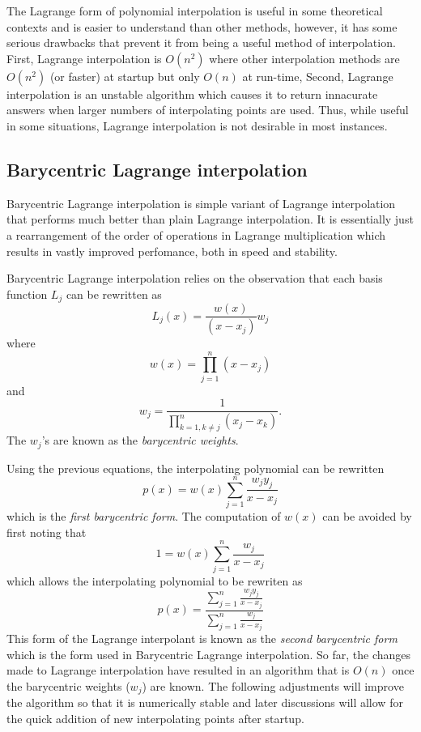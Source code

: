 The Lagrange form of polynomial interpolation is useful in some theoretical contexts and is easier to understand than other methods, however, it has some serious drawbacks that prevent it from being a
useful method of interpolation.
First, Lagrange interpolation is $O(n^2)$ where other interpolation methods are $O(n^2)$ (or faster) at startup but only $O(n)$ at run-time,
Second, Lagrange interpolation is an unstable algorithm which causes it to return innacurate answers when larger numbers of interpolating points are used.
Thus, while useful in some situations, Lagrange interpolation is not desirable in most instances.

\subsection*{Barycentric Lagrange interpolation}
Barycentric Lagrange interpolation is simple variant of Lagrange interpolation that performs much better than plain Lagrange interpolation.
It is essentially just a rearrangement of the order of operations in Lagrange multiplication which results in vastly improved perfomance, both in speed and stability.

Barycentric Lagrange interpolation relies on the observation that each basis function $L_j$ can be rewritten as
\[
L_j(x) = \frac{w(x)}{(x-x_j)}w_j
\]
where
\[
w(x) = \prod_{j=1}^n (x-x_j)
\]
and
\[
w_j = \frac{1}{\prod_{k=1, k \neq j}^n (x_j-x_k)}.
\]
The $w_j$'s are known as the \emph{barycentric weights}.

Using the previous equations, the interpolating polynomial can be rewritten
\[
p(x) = w(x) \sum_{j=1}^n \frac{w_j y_j}{x-x_j}
\]
which is the \emph{first barycentric form}.
The computation of $w(x)$ can be avoided by first noting that
\[
1 = w(x) \sum_{j=1}^n \frac{w_j}{x-x_j}
\]
which allows the interpolating polynomial to be rewriten as
\[
p(x) = \frac{\displaystyle\sum_{j=1}^n \frac{w_j y_j}{x-x_j}}{\displaystyle\sum_{j=1}^n \frac{w_j}{x-x_j}}
\]
This form of the Lagrange interpolant is known as the \emph{second barycentric form} which is the form used in Barycentric Lagrange interpolation.
So far, the changes made to Lagrange interpolation have resulted in an algorithm that is $O(n)$ once the barycentric weights ($w_j$) are known.
The following adjustments will improve the algorithm so that it is numerically stable and later discussions will allow for the quick addition of new interpolating points after startup.

